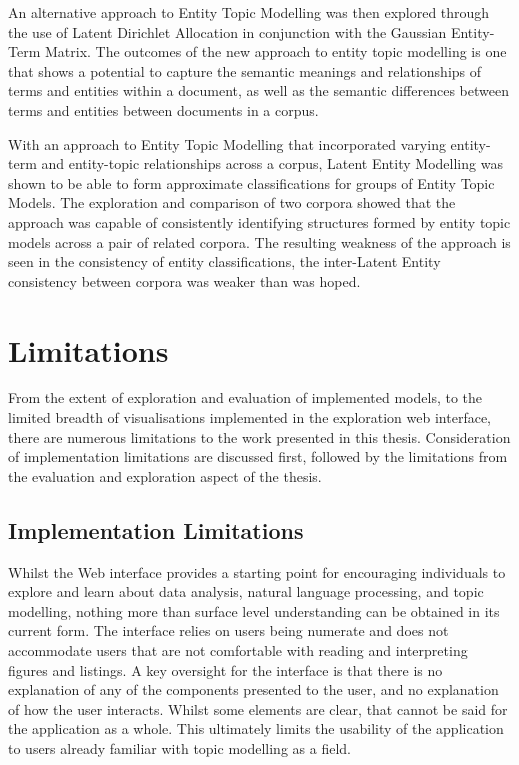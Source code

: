 \documentclass[10pt]{report}
\begin{document}
An alternative approach to Entity Topic Modelling was then explored through the use of Latent Dirichlet Allocation in conjunction with the Gaussian Entity-Term Matrix. The outcomes of the new approach to entity topic modelling is one that shows a potential to capture the semantic meanings and relationships of terms and entities within a document, as well as the semantic differences between terms and entities between documents in a corpus.

With an approach to Entity Topic Modelling that incorporated varying entity-term and entity-topic relationships across a corpus, Latent Entity Modelling was shown to be able to form approximate classifications for groups of Entity Topic Models. The exploration and comparison of two corpora showed that the approach was capable of consistently identifying structures formed by entity topic models across a pair of related corpora. The resulting weakness of the approach is seen in the consistency of entity classifications, the inter-Latent Entity consistency between corpora was weaker than was hoped.

\section{Limitations}
From the extent of exploration and evaluation of implemented models, to the limited breadth of visualisations implemented in the exploration web interface, there are numerous limitations to the work presented in this thesis. Consideration of implementation limitations are discussed first, followed by the limitations from the evaluation and exploration aspect of the thesis.

\subsection{Implementation Limitations}

Whilst the Web interface provides a starting point for encouraging individuals to explore and learn about data analysis, natural language processing, and topic modelling, nothing more than surface level understanding can be obtained in its current form. The interface relies on users being numerate and does not accommodate users that are not comfortable with reading and interpreting figures and listings. A key oversight for the interface is that there is no explanation of any of the components presented to the user, and no explanation of how the user interacts. Whilst some elements are clear, that cannot be said for the application as a whole. This ultimately limits the usability of the application to users already familiar with topic modelling as a field.
\end{document}

